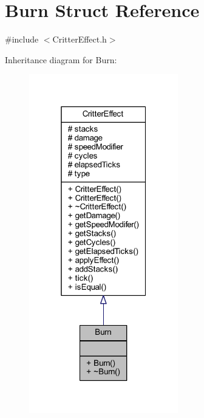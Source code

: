 \hypertarget{struct_burn}{\section{Burn Struct Reference}
\label{struct_burn}
}


{\ttfamily \#include $<$Critter\+Effect.\+h$>$}



Inheritance diagram for Burn\+:
\nopagebreak
\begin{figure}[H]
\begin{center}
\leavevmode
\includegraphics[width=184pt]{struct_burn__inherit__graph}
\end{center}
\end{figure}


